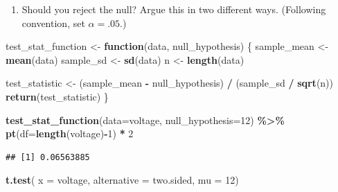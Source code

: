 \documentclass[
]{book}
\newenvironment{Shaded}{\begin{snugshade}}{\end{snugshade}}
\newcommand{\AttributeTok}[1]{\textcolor[rgb]{0.13,0.29,0.53}{#1}}
\newcommand{\ControlFlowTok}[1]{\textcolor[rgb]{0.13,0.29,0.53}{\textbf{#1}}}
\newcommand{\DecValTok}[1]{\textcolor[rgb]{0.00,0.00,0.81}{#1}}
\newcommand{\FunctionTok}[1]{\textcolor[rgb]{0.13,0.29,0.53}{\textbf{#1}}}
\newcommand{\NormalTok}[1]{#1}
\newcommand{\OtherTok}[1]{\textcolor[rgb]{0.56,0.35,0.01}{#1}}
\newcommand{\SpecialCharTok}[1]{\textcolor[rgb]{0.81,0.36,0.00}{\textbf{#1}}}
\newcommand{\StringTok}[1]{\textcolor[rgb]{0.31,0.60,0.02}{#1}}
\providecommand{\tightlist}{%
  \setlength{\itemsep}{0pt}\setlength{\parskip}{0pt}}
\theoremstyle{definition}
\theoremstyle{definition}
\theoremstyle{definition}
\theoremstyle{definition}
\theoremstyle{remark}
\begin{document}
\begin{enumerate}
\def\labelenumi{\arabic{enumi}.}
\setcounter{enumi}{4}
\tightlist
\item
  Should you reject the null? Argue this in two different ways. (Following convention, set \(\alpha = .05\).)
\end{enumerate}

\begin{Shaded}
\begin{Highlighting}[]
\NormalTok{test\_stat\_function }\OtherTok{\textless{}{-}} \ControlFlowTok{function}\NormalTok{(data, null\_hypothesis) \{ }
\NormalTok{  sample\_mean }\OtherTok{\textless{}{-}} \FunctionTok{mean}\NormalTok{(data)}
\NormalTok{  sample\_sd   }\OtherTok{\textless{}{-}} \FunctionTok{sd}\NormalTok{(data)}
\NormalTok{  n           }\OtherTok{\textless{}{-}} \FunctionTok{length}\NormalTok{(data)}
  
\NormalTok{  test\_statistic }\OtherTok{\textless{}{-}}\NormalTok{ (sample\_mean }\SpecialCharTok{{-}}\NormalTok{ null\_hypothesis) }\SpecialCharTok{/}\NormalTok{ (sample\_sd }\SpecialCharTok{/} \FunctionTok{sqrt}\NormalTok{(n))}
  \FunctionTok{return}\NormalTok{(test\_statistic)}
\NormalTok{\}}
\end{Highlighting}
\end{Shaded}

\begin{Shaded}
\begin{Highlighting}[]
\FunctionTok{test\_stat\_function}\NormalTok{(}\AttributeTok{data=}\NormalTok{voltage, }\AttributeTok{null\_hypothesis=}\DecValTok{12}\NormalTok{) }\SpecialCharTok{\%\textgreater{}\%} 
  \FunctionTok{pt}\NormalTok{(}\AttributeTok{df=}\FunctionTok{length}\NormalTok{(voltage)}\SpecialCharTok{{-}}\DecValTok{1}\NormalTok{) }\SpecialCharTok{*} \DecValTok{2}
\end{Highlighting}
\end{Shaded}

\begin{verbatim}
## [1] 0.06563885
\end{verbatim}

\begin{Shaded}
\begin{Highlighting}[]
\FunctionTok{t.test}\NormalTok{(}
  \AttributeTok{x           =}\NormalTok{ voltage, }
  \AttributeTok{alternative =} \StringTok{\textquotesingle{}two.sided\textquotesingle{}}\NormalTok{, }
  \AttributeTok{mu          =} \DecValTok{12}\NormalTok{)}
\end{Highlighting}
\end{Shaded}
\end{document}
